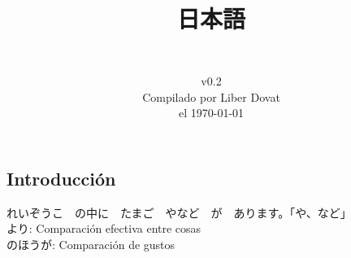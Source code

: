 \documentclass[a4paper,12pt,oneside]{report}
\begin{document}
\begin{CJK*}{UTF8}{min}%



  \title{
    \begin{flushright}
      \Huge  日本語\\
      \LARGE {}
    \end{flushright}
  } %

  \author{\vspace{7cm}\\
    v0.2\\
    Compilado por Liber Dovat\\
    el \today\\
  } %

  \date{}
  \maketitle

  \newpage


  \tableofcontents
  \thispagestyle{plain}

  \newpage




  \chapter{Introducci\'on}
  \thispagestyle{contenido} %
  \pagestyle{contenido}     %

    れいぞうこ　の中に　たまご　やなど　が　あります。「や、など」
    \\

    より: Comparación efectiva entre cosas
    \\

    のほうが: Comparación de gustos
    \\




\end{CJK*}
\end{document}

